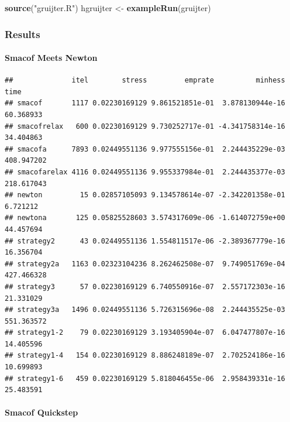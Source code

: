 \documentclass[
  12pt,
]{article}
\newenvironment{Shaded}{\begin{snugshade}}{\end{snugshade}}
\newcommand{\AttributeTok}[1]{\textcolor[rgb]{0.13,0.29,0.53}{#1}}
\newcommand{\DecValTok}[1]{\textcolor[rgb]{0.00,0.00,0.81}{#1}}
\newcommand{\FunctionTok}[1]{\textcolor[rgb]{0.13,0.29,0.53}{\textbf{#1}}}
\newcommand{\NormalTok}[1]{#1}
\newcommand{\OtherTok}[1]{\textcolor[rgb]{0.56,0.35,0.01}{#1}}
\newcommand{\SpecialCharTok}[1]{\textcolor[rgb]{0.81,0.36,0.00}{\textbf{#1}}}
\newcommand{\StringTok}[1]{\textcolor[rgb]{0.31,0.60,0.02}{#1}}
\begin{document}
\begin{Shaded}
\begin{Highlighting}[]
\FunctionTok{source}\NormalTok{(}\StringTok{"gruijter.R"}\NormalTok{)}
\NormalTok{hgruijter }\OtherTok{\textless{}{-}} \FunctionTok{exampleRun}\NormalTok{(gruijter)}
\end{Highlighting}
\end{Shaded}

\subsubsection{Results}\label{results-4}

\paragraph{Smacof Meets Newton}\label{smacof-meets-newton-4}

\begin{verbatim}
##              itel        stress         emprate          minhess       time
## smacof       1117 0.02230169129 9.861521851e-01  3.878130944e-16  60.368933
## smacofrelax   600 0.02230169129 9.730252717e-01 -4.341758314e-16  34.404863
## smacofa      7893 0.02449551136 9.977555156e-01  2.244435229e-03 408.947202
## smacofarelax 4116 0.02449551136 9.955337984e-01  2.244435377e-03 218.617043
## newton         15 0.02857105093 9.134578614e-07 -2.342201358e-01   6.721212
## newtona       125 0.05825528603 3.574317609e-06 -1.614072759e+00  44.457694
## strategy2      43 0.02449551136 1.554811517e-06 -2.389367779e-16  16.356704
## strategy2a   1163 0.02323104236 8.262462508e-07  9.749051769e-04 427.466328
## strategy3      57 0.02230169129 6.740550916e-07  2.557172303e-16  21.331029
## strategy3a   1496 0.02449551136 5.726315696e-08  2.244435525e-03 551.363572
## strategy1-2    79 0.02230169129 3.193405904e-07  6.047477807e-16  14.405596
## strategy1-4   154 0.02230169129 8.886248189e-07  2.702524186e-16  10.699893
## strategy1-6   459 0.02230169129 5.818046455e-06  2.958439331e-16  25.483591
\end{verbatim}

\paragraph{Smacof Quickstep}\label{smacof-quickstep-4}

\begin{Shaded}
\end{Shaded}
\end{document}
